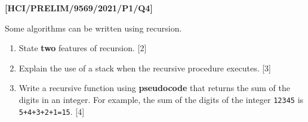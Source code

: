 \item \textbf{{[}HCI/PRELIM/9569/2021/P1/Q4{]}}

Some algorithms can be written using recursion.
\begin{enumerate}
\item State \textbf{two} features of recursion. \hfill{}{[}2{]}
\item Explain the use of a stack when the recursive procedure executes.
\hfill{}{[}3{]}
\item Write a recursive function using \textbf{pseudocode} that returns
the sum of the digits in an integer. For example, the sum of the digits
of the integer \texttt{12345} is \texttt{5+4+3+2+1=15}. \hfill{}{[}4{]}
\end{enumerate}